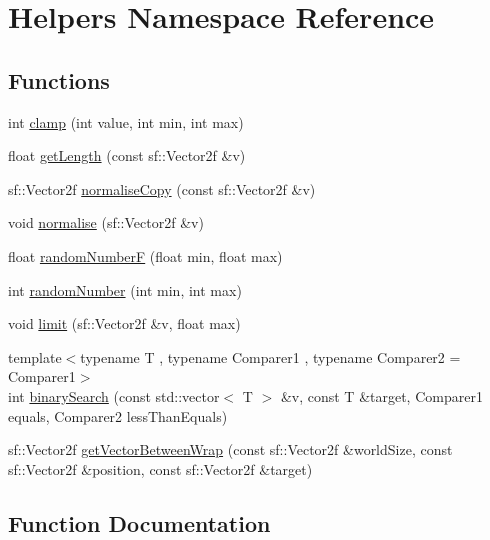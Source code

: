 \hypertarget{namespace_helpers}{}\section{Helpers Namespace Reference}
\label{namespace_helpers}
\subsection*{Functions}
\begin{DoxyCompactItemize}
\item 
int \hyperlink{namespace_helpers_acafe0d99760ee8ee1ffbd365f974cafe}{clamp} (int value, int min, int max)
\item 
float \hyperlink{namespace_helpers_aad7d5773a24a3413ca8eca68aa6a872b}{get\+Length} (const sf\+::\+Vector2f \&v)
\item 
sf\+::\+Vector2f \hyperlink{namespace_helpers_a1c0a40432177c275488a904ea94eda66}{normalise\+Copy} (const sf\+::\+Vector2f \&v)
\item 
void \hyperlink{namespace_helpers_acf3ecf44a1d56b27ec102715bae903c1}{normalise} (sf\+::\+Vector2f \&v)
\item 
float \hyperlink{namespace_helpers_ad1aef5710c67da43b9bbed2107c1e11b}{random\+NumberF} (float min, float max)
\item 
int \hyperlink{namespace_helpers_af4d3e03c8af50c930d3164b155f02e98}{random\+Number} (int min, int max)
\item 
void \hyperlink{namespace_helpers_a7b90b08e0cd27e52500271b582f8797b}{limit} (sf\+::\+Vector2f \&v, float max)
\item 
{\footnotesize template$<$typename T , typename Comparer1 , typename Comparer2  = Comparer1$>$ }\\int \hyperlink{namespace_helpers_a17de449489ff14414634beaa710176cd}{binary\+Search} (const std\+::vector$<$ T $>$ \&v, const T \&target, Comparer1 equals, Comparer2 less\+Than\+Equals)
\item 
sf\+::\+Vector2f \hyperlink{namespace_helpers_a93defc4f62a0b29303b84ea17eeeb2fb}{get\+Vector\+Between\+Wrap} (const sf\+::\+Vector2f \&world\+Size, const sf\+::\+Vector2f \&position, const sf\+::\+Vector2f \&target)
\end{DoxyCompactItemize}


\subsection{Function Documentation}
\mbox{\label{namespace_helpers_a17de449489ff14414634beaa710176cd}} 
